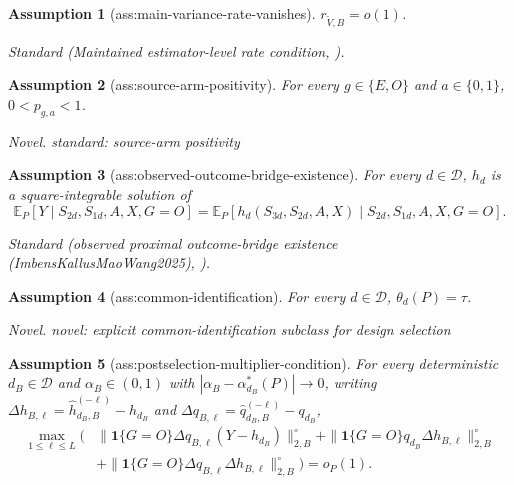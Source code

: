 \documentclass{article}
\newtheorem{assumption}{Assumption}
\begin{document}
\begin{assumption}[ass:main-variance-rate-vanishes]\label{ass:main-variance-rate-vanishes}
\(r_{\widetilde V,B}=o(1)\).
\par\smallskip\noindent\emph{Standard} (Maintained estimator-level rate condition, \cite{ChernozhukovEtAl2018}).
\end{assumption}

\begin{assumption}[ass:source-arm-positivity]\label{ass:source-arm-positivity}
For every \(g\in\{E,O\}\) and \(a\in\{0,1\}\), \(0<p_{g,a}<1\).
\par\smallskip\noindent\emph{Novel.} standard: source-arm positivity
\end{assumption}

\begin{assumption}[ass:observed-outcome-bridge-existence]\label{ass:observed-outcome-bridge-existence}
For every \(d\in\mathcal D\), \(h_d\) is a square-integrable solution of
\[
\mathbb E_P[Y\mid S_{2d},S_{1d},A,X,G=O]
=\mathbb E_P[h_d(S_{3d},S_{2d},A,X)\mid S_{2d},S_{1d},A,X,G=O].
\]
\par\smallskip\noindent\emph{Standard} (observed proximal outcome-bridge existence (ImbensKallusMaoWang2025), \cite{ImbensKallusMaoWang2025}).
\end{assumption}

\begin{assumption}[ass:common-identification]\label{ass:common-identification}
For every \(d\in\mathcal D\), \(\theta_d(P)=\tau\).
\par\smallskip\noindent\emph{Novel.} novel: explicit common-identification subclass for design selection
\end{assumption}

\begin{assumption}[ass:postselection-multiplier-condition]\label{ass:postselection-multiplier-condition}
For every deterministic \(d_B\in\mathcal D\) and \(\alpha_B\in(0,1)\) with \(|\alpha_B-\alpha_{d_B}^*(P)|\to0\), writing \(\Delta h_{B,\ell}=\widehat h_{d_B,B}^{(-\ell)}-h_{d_B}\) and \(\Delta q_{B,\ell}=\widehat q_{d_B,B}^{(-\ell)}-q_{d_B}\),
\[
\begin{aligned}
\max_{1\le\ell\le L}\bigl(&
\|\mathbf1\{G=O\}\Delta q_{B,\ell}(Y-h_{d_B})\|_{2,B}^{\circ}
+\|\mathbf1\{G=O\}q_{d_B}\Delta h_{B,\ell}\|_{2,B}^{\circ}\\
&+\|\mathbf1\{G=O\}\Delta q_{B,\ell}\Delta h_{B,\ell}\|_{2,B}^{\circ}
\bigr)=o_P(1).
\end{aligned}
\]
\end{assumption}
\end{document}
